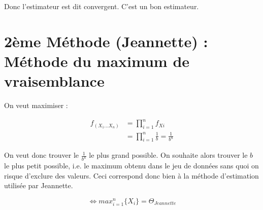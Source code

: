 \documentclass{article}
\begin{document}
Donc l'estimateur est dit convergent. C'est un bon estimateur.

\section{2ème Méthode (Jeannette) : Méthode du maximum de vraisemblance}

On veut maximiser :

\begin{equation}
    \begin{aligned}
        f_{(X_1...X_n)}&=\prod_{i=1}^{n}f_{Xi}\\
        &=\prod_{i=1}^{n}\frac{1}{b}=\frac{1}{b^n}
    \end{aligned}
\end{equation}

On veut donc trouver le $\frac{1}{b^n}$ le plus grand possible. On souhaite alors trouver le $b$ le plus petit possible, i.e. le maximum obtenu dans le jeu de données sans quoi on risque d'exclure des valeurs. Ceci correspond donc bien à la méthode d'estimation utilisée par Jeannette.

$$
\Leftrightarrow max_{i=1}^n \{X_i\} = \Theta_{Jeannette}
$$
\end{document}
